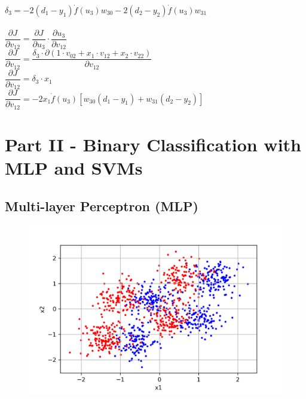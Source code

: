 \documentclass[a4paper]{article}    %
\begin{document}
%
$ \delta_3 = - 2(d_1-y_1)\dot{f}(u_3)w_{30} - 2(d_2-y_2)\dot{f}(u_3)w_{31} $\\
\vspace{0.1mm}\\
%
$ \dfrac{\partial J}{\partial v_{12}} = \dfrac{\partial J}{\partial u_3} \cdot \dfrac{\partial u_3}{\partial v_{12}} $\\
$ \dfrac{\partial J}{\partial v_{12}} = \dfrac{\delta_3 \cdot \partial(1 \cdot v_{02} + x_1 \cdot v_{12} + x_2 \cdot v_{22})}{\partial v_{12}} $\\
$ \dfrac{\partial J}{\partial v_{12}} = \delta_3 \cdot x_1 $\\
$ \boxed{ \dfrac{\partial J}{\partial v_{12}} = -2x_1\dot{f}(u_3)[w_{30}(d_1-y_1) + w_{31}(d_2-y_2)] }$\\
\vspace{0.1mm}

\section{Part II - Binary Classification with MLP and SVMs}

\subsection{Multi-layer Perceptron (MLP)}

\begin{figure}[H]
    \centering
    \includegraphics[width=12cm]{raw_data}
    \caption{}
    \label{fig:mlp-raw_data}
\end{figure}
\end{document}
